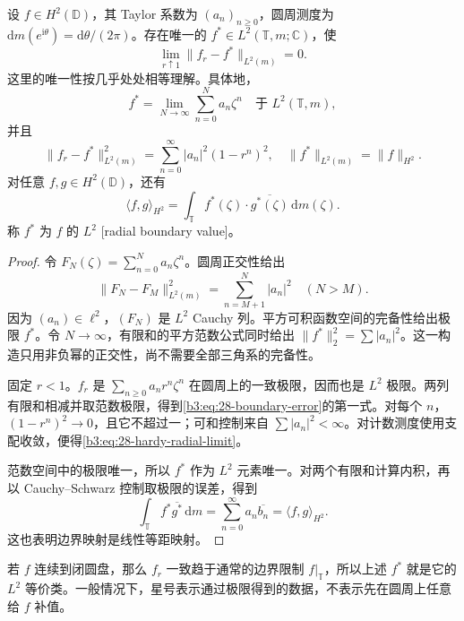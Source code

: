 \begin{theorem}\label{b3:thm:28-hardy-boundary}
设 \(f\in H^2(\mathbb D)\)，其 Taylor 系数为 \((a_n)_{n\ge0}\)，圆周测度为 \(\mathrm dm(e^{\mathrm i\theta})=\mathrm d\theta/(2\pi)\)。存在唯一的 \(f^*\in L^2(\mathbb T,m;\mathbb C)\)，使
\begin{equation}\label{b3:eq:28-hardy-radial-limit}
 \lim_{r\uparrow1}\|f_r-f^*\|_{L^2(m)}=0.
\end{equation}
这里的唯一性按几乎处处相等理解。具体地，
\[
 f^*=\lim_{N\to\infty}\sum_{n=0}^Na_n\zeta^n
 \quad\text{于 }L^2(\mathbb T,m),
\]
并且
\begin{equation}\label{b3:eq:28-boundary-error}
 \|f_r-f^*\|_{L^2(m)}^2
 =\sum_{n=0}^{\infty}|a_n|^2(1-r^n)^2,
 \quad \|f^*\|_{L^2(m)}=\|f\|_{H^2}.
\end{equation}
对任意 \(f,g\in H^2(\mathbb D)\)，还有
\[
 \langle f,g\rangle_{H^2}
 =\int_{\mathbb T}f^*(\zeta)\cdot\overline{g^*(\zeta)}\,\mathrm dm(\zeta).
\]
称 \(f^*\) 为 \(f\) 的 \(L^2\) [radial boundary value]。
\end{theorem}
\begin{proof}
令 \(F_N(\zeta)=\sum_{n=0}^Na_n\zeta^n\)。圆周正交性给出
\[
 \|F_N-F_M\|_{L^2(m)}^2=\sum_{n=M+1}^N|a_n|^2
 \quad(N>M).
\]
因为 \((a_n)\in\ell^2\)，\((F_N)\) 是 \(L^2\) Cauchy 列。平方可积函数空间的完备性给出极限 \(f^*\)。令 \(N\to\infty\)，有限和的平方范数公式同时给出 \(\|f^*\|_2^2=\sum|a_n|^2\)。这一构造只用非负幂的正交性，尚不需要全部三角系的完备性。

固定 \(r<1\)。\(f_r\) 是 \(\sum_{n\ge0}a_nr^n\zeta^n\) 在圆周上的一致极限，因而也是 \(L^2\) 极限。两列有限和相减并取范数极限，得到\eqref{b3:eq:28-boundary-error}的第一式。对每个 \(n\)，\((1-r^n)^2\to0\)，且它不超过一；可和控制来自 \(\sum|a_n|^2<\infty\)。对计数测度使用支配收敛，便得\eqref{b3:eq:28-hardy-radial-limit}。

范数空间中的极限唯一，所以 \(f^*\) 作为 \(L^2\) 元素唯一。对两个有限和计算内积，再以 Cauchy--Schwarz 控制取极限的误差，得到
\[
 \int_{\mathbb T}f^*\overline{g^*}\,\mathrm dm
 =\sum_{n=0}^{\infty}a_n\overline{b_n}
 =\langle f,g\rangle_{H^2}.
\]
这也表明边界映射是线性等距映射。
\end{proof}

若 \(f\) 连续到闭圆盘，那么 \(f_r\) 一致趋于通常的边界限制 \(f|_{\mathbb T}\)，所以上述 \(f^*\) 就是它的 \(L^2\) 等价类。一般情况下，星号表示通过极限得到的数据，不表示先在圆周上任意给 \(f\) 补值。

